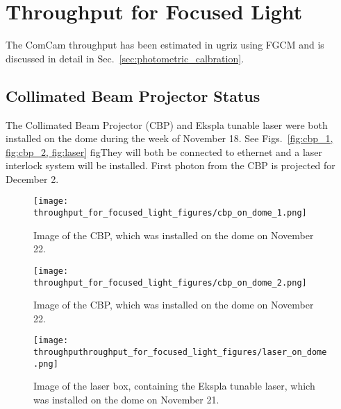 \section{Throughput for Focused Light}
\label{sec:throughout_for_focused_light}

The ComCam throughput has been estimated in ugriz using FGCM and is discussed in detail in Sec.~\ref{sec:photometric_calbration}.

\subsection{Collimated Beam Projector Status}

The Collimated Beam Projector (CBP) and Ekspla tunable laser were both installed on the dome during the week of November 18. See Figs.~\ref{fig:cbp_1, fig:cbp_2, fig:laser} figThey will both be connected to ethernet and a laser interlock system will be installed. First photon from the CBP is projected for December 2.

\begin{figure}
  \texttt{[image: throughput\_for\_focused\_light\_figures/cbp\_on\_dome\_1.png]}
  \caption{Image of the CBP, which was installed on the dome on November 22.}
  \label{fig:cbp_1}
\end{figure}
  
\begin{figure}
  \texttt{[image: throughput\_for\_focused\_light\_figures/cbp\_on\_dome\_2.png]}
  \caption{Image of the CBP, which was installed on the dome on November 22.}
  \label{fig:cbp_2}
\end{figure}
  
\begin{figure}
  \texttt{[image: throughputhroughput\_for\_focused\_light\_figures/laser\_on\_dome.png]}
  \caption{Image of the laser box, containing the Ekspla tunable laser, which was installed on the dome on November 21.}
  \label{fig:laser}
\end{figure}